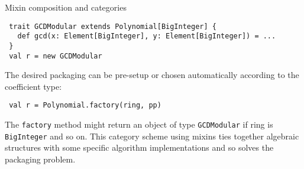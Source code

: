\documentclass[final]{beamer}
\newcommand{\code}[1]{\texttt{#1}}
\begin{document}
\begin{frame}[fragile]
\begin{columns}[t]
\begin{column}{.3\linewidth}
\begin{block}{\large Mixin composition and categories}
\begin{lstlisting}
 trait GCDModular extends Polynomial[BigInteger] {
   def gcd(x: Element[BigInteger], y: Element[BigInteger]) = ...
 }
 val r = new GCDModular
\end{lstlisting}
{\footnotesize The desired packaging can be pre-setup or chosen
automatically according to the coefficient type:}
\begin{lstlisting}
 val r = Polynomial.factory(ring, pp)
\end{lstlisting}
{\footnotesize The \code{factory} method might return an object of type
\code{GCDModular} if ring is \code{BigInteger} and so on.
This category scheme using mixins ties together algebraic structures
with some specific algorithm implementations and so solves the packaging
problem.}
  \end{block}
\end{column}

\end{columns}

\end{frame}


%
%
%
\end{document}

